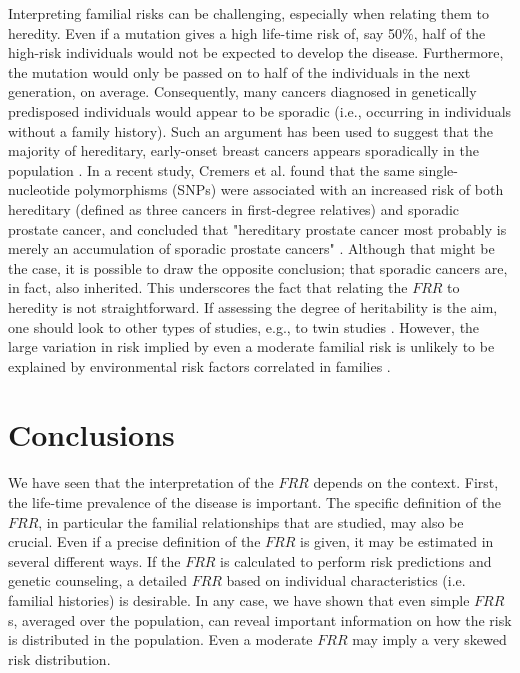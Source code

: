 \documentclass{bmcart}
\begin{document}
Interpreting familial risks can be challenging, especially when relating them to heredity. Even if a mutation gives a high life-time risk of, say 50\%, half of the high-risk individuals would not be expected to develop the disease. Furthermore, the mutation would only be passed on to half of the individuals in the next generation, on average. Consequently, many cancers diagnosed in genetically predisposed individuals would appear to be sporadic (i.e., occurring in individuals without a family history). Such an argument has been used to suggest that the majority of hereditary, early-onset breast cancers appears sporadically in the population \cite{cui2000majority}. In a recent study, Cremers et al. found that the same single-nucleotide polymorphisms (SNPs) were associated with an increased risk of both hereditary (defined as three cancers in first-degree relatives) and sporadic prostate cancer, and concluded that "hereditary prostate cancer most probably is merely an accumulation of sporadic prostate cancers" \cite{cremers2015known}. Although that might be the case, it is possible to draw the opposite conclusion; that sporadic cancers are, in fact, also inherited. This underscores the fact that relating the $FRR$ to heredity is not straightforward. If assessing the degree of heritability is the aim, one should look to other types of studies, e.g., to twin studies \cite{mucci2016familial,stensrud2017inequality}. However, the large variation in risk implied by even a moderate familial risk is unlikely to be explained by environmental risk factors correlated in families \cite{khoury1988can,aalen1991modelling,risch2001genetic}.

\section*{Conclusions}
We have seen that the interpretation of the $FRR$ depends on the context. First, the life-time prevalence of the disease is important. The specific definition of the $FRR$, in particular the familial relationships that are studied, may also be crucial. Even if a precise definition of the $FRR$ is given, it may be estimated in several different ways. If the $FRR$ is calculated to perform risk predictions and genetic counseling, a detailed $FRR$ based on individual characteristics (i.e. familial histories) is desirable. In any case, we have shown that even simple $FRR$s, averaged over the population, can reveal important information on how the risk is distributed in the population. Even a moderate $FRR$ may imply a very skewed risk distribution.
\end{document}
